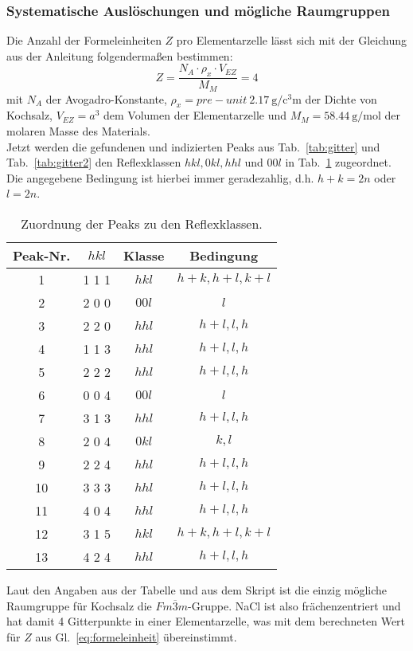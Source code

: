 \subsubsection{Systematische Auslöschungen und mögliche Raumgruppen}
Die Anzahl der Formeleinheiten $Z$ pro Elementarzelle lässt sich mit der Gleichung aus der Anleitung folgendermaßen bestimmen:
\begin{equation}\label{eq:formeleinheit}
    Z = \frac{N_A \cdot \rho_x \cdot V_{EZ}}{M_M} = 4
\end{equation}
mit $N_A$ der Avogadro-Konstante, $\rho_x = \SI{2,17}[pre-unit]{\gram \per \cubic \centi\metre}$ der Dichte von Kochsalz, $V_{EZ} = a^3$ dem Volumen der Elementarzelle und $M_M = \SI{58,44}[]{\gram \per \mol}$ der molaren Masse des Materials.\\
Jetzt werden die gefundenen und indizierten Peaks aus Tab.~\ref{tab:gitter} und Tab.~\ref{tab:gitter2} den Reflexklassen $hkl, 0kl, hhl $ und $00l$ in Tab.~\ref{tab:zuordnung} zugeordnet. Die angegebene Bedingung ist hierbei immer geradezahlig, d.h. $h+k = 2n$ oder $l = 2n$.

\begin{table}[h!]
    \centering
     \begin{tabular}{|c|c|c|c|} 
     \hline
     Peak-Nr. &  $h k l$ & Klasse & Bedingung\\ [0.5ex] 
     \hline\hline
     1 & 1 1 1 & $hkl$ &  $h+k, h+l, k+l$ \\
     2 & 2 0 0 & $00l$ & $l$\\
     3 & 2 2 0 & $hhl$ &  $h+l, l, h$\\
     4 & 1 1 3 & $hhl$ & $h+l, l, h$\\
     5 & 2 2 2 & $hhl$ & $h+l, l, h$\\
     6 & 0 0 4 & $00l$ & $l$\\
     7 & 3 1 3 & $hhl$ & $h+l, l, h$\\
     8 & 2 0 4 & $0kl$ & $k, l$\\
     9 & 2 2 4 & $hhl$ & $h+l, l, h$\\
     10 & 3 3 3 & $hhl$ & $h+l, l, h$\\
     11 & 4 0 4 & $hhl$ & $h+l, l, h$\\
     12 & 3 1 5 & $hkl$ & $h+k, h+l, k+l$\\
     13 & 4 2 4 & $hhl$ & $h+l, l, h$\\  [1ex]
     \hline
    
     \end{tabular}
     \caption[short]{Zuordnung der Peaks zu den Reflexklassen.}
     \label{tab:zuordnung}
\end{table}

Laut den Angaben aus der Tabelle und aus dem Skript ist die einzig mögliche Raumgruppe für Kochsalz die $Fm\overline{3}m$-Gruppe. NaCl ist also frächenzentriert und hat damit 4 Gitterpunkte in einer Elementarzelle, was mit dem berechneten Wert für $Z$ aus Gl.~\ref{eq:formeleinheit} übereinstimmt.\\